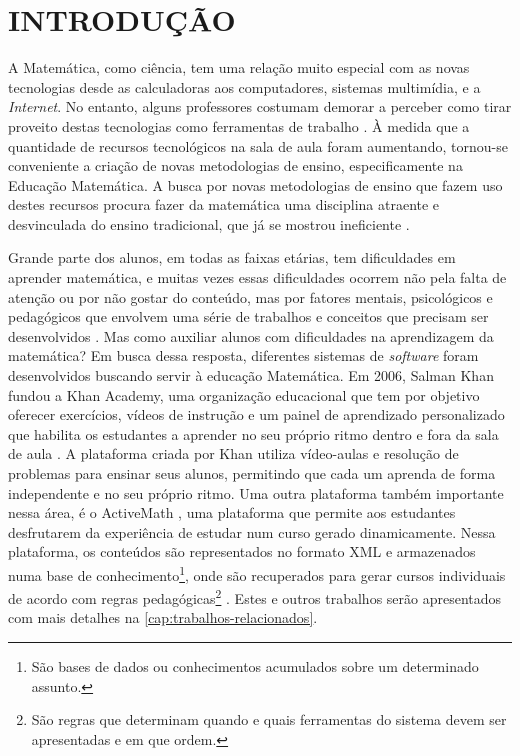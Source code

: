 \chapter{INTRODUÇÃO}
\label{cap:introducao}

A Matemática, como ciência, tem uma relação muito especial com as novas tecnologias desde as calculadoras aos computadores, sistemas 
multim\'idia, e a \textit{Internet}. No entanto, alguns professores costumam demorar a perceber como tirar proveito destas tecnologias como 
ferramentas de trabalho \cite{da1997ensino}. \`A medida que a quantidade de recursos tecnológicos na sala de aula foram aumentando, 
tornou-se conveniente a criação de novas metodologias de ensino, especificamente na Educação Matemática. A busca por novas 
metodologias de ensino que fazem uso destes recursos procura fazer da matemática uma disciplina atraente e desvinculada do ensino 
tradicional, que já se mostrou ineficiente \cite{silva2009ambiente}.

Grande parte dos alunos, em todas as faixas etárias, tem dificuldades em aprender matemática, e muitas vezes essas dificuldades ocorrem 
não pela falta de atenção ou por não gostar do conteúdo, mas por fatores mentais, psicológicos e pedag\'ogicos que envolvem uma série de 
trabalhos e conceitos que 
precisam ser desenvolvidos \cite{de2006dificuldades}. Mas como auxiliar alunos com dificuldades na aprendizagem da matemática? Em busca 
dessa resposta, diferentes sistemas de \textit{software} foram desenvolvidos buscando servir \`a  educação Matem\'atica. Em 2006, Salman 
Khan fundou a Khan Academy, uma organização educacional que tem por objetivo oferecer exercícios, vídeos de instrução e um painel de 
aprendizado personalizado que habilita os estudantes a aprender no seu próprio ritmo dentro e fora da sala de aula \cite{khan2012one}. A 
plataforma criada por Khan utiliza vídeo-aulas e resolução de problemas para ensinar seus alunos, permitindo que cada um aprenda de forma 
independente e no seu pr\'oprio ritmo. Uma outra plataforma também  importante nessa área, \'e o ActiveMath 
\cite{melis2001activemath}, uma plataforma que permite aos estudantes desfrutarem da experiência de estudar num 
curso gerado dinamicamente. Nessa plataforma, os conte\'udos s\~ao representados no formato XML \cite{bray1998extensible} e armazenados 
numa base de conhecimento\footnote{São bases de dados ou conhecimentos acumulados sobre um determinado assunto.}, onde s\~ao recuperados para gerar cursos individuais de acordo com regras 
pedagógicas\footnote{S\~ao regras que determinam quando e quais ferramentas do sistema devem ser apresentadas e em que ordem.} 
\cite{melis2004activemath}. Estes e outros trabalhos serão apresentados com mais detalhes na \autoref{cap:trabalhos-relacionados}.

